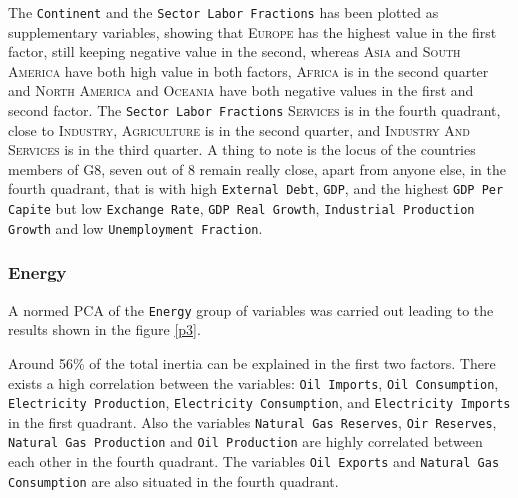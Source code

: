 \documentclass[a4paper,10pt,twocolumn]{article}
\begin{document}
The \texttt{Continent} and the \texttt{Sector Labor Fractions} has been plotted as supplementary variables, showing that \textsc{Europe} has the highest value in the first factor, still keeping negative value in the second, whereas \textsc{Asia} and \textsc{South America} have both high value in both factors, \textsc{Africa} is in the second quarter and \textsc{North America} and \textsc{Oceania} have both negative values in the first and second factor. The \texttt{Sector Labor Fractions} \textsc{Services} is in the fourth quadrant, close to \textsc{Industry}, \textsc{Agriculture} is in the second quarter, and \textsc{Industry And Services} is in the third quarter. A thing to note is the locus of the countries members of \textsc{G8}, seven out of 8 remain really close, apart from anyone else, in the fourth quadrant, that is with high \texttt{External Debt}, \texttt{GDP}, and the highest \texttt{GDP Per Capite} but low \texttt{Exchange Rate}, \texttt{GDP Real Growth}, \texttt{Industrial Production Growth} and low \texttt{Unemployment Fraction}.

\subsubsection{Energy}
A normed PCA of the \texttt{Energy} group of variables was carried out leading to the results shown in the figure \ref{p3}. 

Around 56\% of the total inertia can be explained in the first two factors. There exists a high correlation between the variables: \texttt{Oil Imports}, \texttt{Oil Consumption}, \texttt{Electricity Production}, \texttt{Electricity Consumption}, and \texttt{Electricity Imports} in the first quadrant. Also the variables \texttt{Natural Gas Reserves}, \texttt{Oir Reserves}, \texttt{Natural Gas Production} and \texttt{Oil Production} are highly correlated between each other in the fourth quadrant. The variables \texttt{Oil Exports} and \texttt{Natural Gas Consumption} are also situated in the fourth quadrant. 
\end{document}
